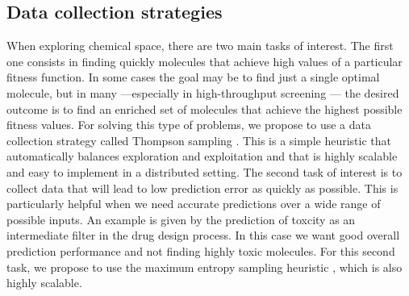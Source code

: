 \subsection{Data collection strategies}

When exploring chemical space, there are two main tasks of interest. The first one consists in finding quickly molecules that achieve high values of a particular fitness function. In some cases the goal may be to find just a single optimal molecule, but in many ---especially in high-throughput screening \cite{Pyzer_Knapp_2015a}--- the desired outcome is to find 
an enriched set of molecules that achieve the highest possible fitness values. For solving this type of problems, we propose to use a data collection strategy called Thompson sampling \cite{Thompson_1933}. This is a simple heuristic that automatically balances exploration and exploitation \cite{Chapelle2011} and that is highly scalable and easy to implement in a distributed setting.
The second task of interest is to collect data that will lead to low prediction error as quickly as possible. This is particularly helpful when we need accurate predictions over a wide range of possible inputs. An example is given by the prediction of toxcity as an intermediate filter in the drug design process. In this case we want good overall prediction performance and not finding highly toxic molecules. For this second task, we propose to use the maximum entropy sampling heuristic \cite{MacKay_1992}, which is also highly scalable.